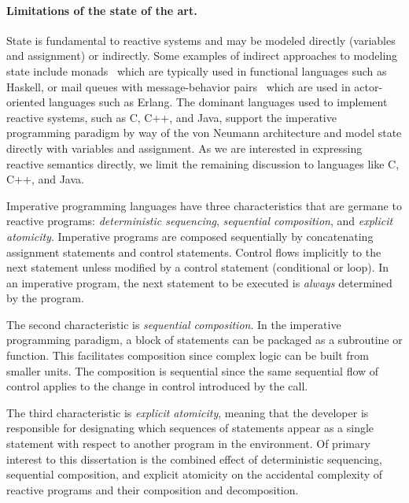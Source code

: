 \paragraph{Limitations of the state of the art.}
State is fundamental to reactive systems and may be modeled directly (variables and assignment) or indirectly.
Some examples of indirect approaches to modeling state include monads~\cite{wadler1990comprehending} which are typically used in functional languages such as Haskell, or mail queues with message-behavior pairs~\cite{agha1985actors} which are used in actor-oriented languages such as Erlang.
The dominant languages used to implement reactive systems, such as C, C++, and Java, support the imperative programming paradigm by way of the von Neumann architecture and model state directly with variables and assignment.
As we are interested in expressing reactive semantics directly, we limit the remaining discussion to languages like C, C++, and Java.

Imperative programming languages have three characteristics that are germane to reactive programs:  \emph{deterministic sequencing}, \emph{sequential composition}, and \emph{explicit atomicity}.
Imperative programs are composed sequentially by concatenating assignment statements and control statements.
Control flows implicitly to the next statement unless modified by a control statement (conditional or loop).
In an imperative program, the next statement to be executed is \emph{always} determined by the program.

The second characteristic is \emph{sequential composition}.
In the imperative programming paradigm, a block of statements can be packaged as a subroutine or function.
This facilitates composition since complex logic can be built from smaller units.
The composition is sequential since the same sequential flow of control applies to the change in control introduced by the call.

The third characteristic is \emph{explicit atomicity}, meaning that the developer is responsible for designating which sequences of statements appear as a single statement with respect to another program in the environment.
Of primary interest to this dissertation is the combined effect of deterministic sequencing, sequential composition, and explicit atomicity on the accidental complexity of reactive programs and their composition and decomposition.

